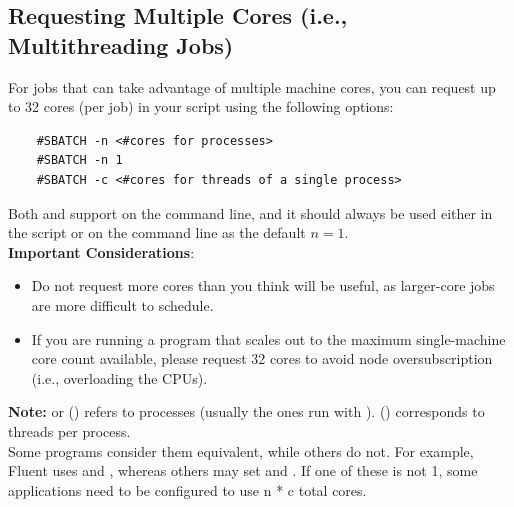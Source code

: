 \subsection{Requesting Multiple Cores (i.e., Multithreading Jobs)}
\label{sect:multicore-jobs}

For jobs that can take advantage of multiple machine cores, you can 
request up to 32 cores (per job) in your script using the following options:

\begin{verbatim}
	#SBATCH -n <#cores for processes>
	#SBATCH -n 1
	#SBATCH -c <#cores for threads of a single process>
\end{verbatim}

\noindent Both  and  support  on the command line,
and it should always be used either in the script or on the command line as the
default $n=1$.\\

\noindent \textbf{Important Considerations}:
\begin{itemize}
	\item Do not request more cores than you think will be useful, 
	as larger-core jobs are more difficult to schedule.

	\item If you are running a program that scales out to the maximum single-machine 
	core count available, please request 32 cores to avoid node 
	oversubscription (i.e., overloading the CPUs).
\end{itemize}

\noindent \textbf{Note:}  or 
() refers to processes (usually the ones run with ).
 () corresponds to threads per process.\\

\noindent Some programs consider them equivalent, while others do not. For example, 
Fluent uses  and ,
whereas others may set  and .
If one of these is not 1, some applications need to be configured to use n * c total cores.\\

